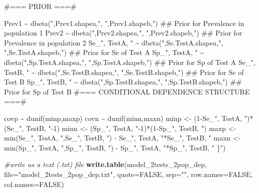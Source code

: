 \documentclass[
]{book}
\newenvironment{Shaded}{\begin{snugshade}}{\end{snugshade}}
\newcommand{\AttributeTok}[1]{\textcolor[rgb]{0.13,0.29,0.53}{#1}}
\newcommand{\CommentTok}[1]{\textcolor[rgb]{0.56,0.35,0.01}{\textit{#1}}}
\newcommand{\ConstantTok}[1]{\textcolor[rgb]{0.56,0.35,0.01}{#1}}
\newcommand{\FunctionTok}[1]{\textcolor[rgb]{0.13,0.29,0.53}{\textbf{#1}}}
\newcommand{\NormalTok}[1]{#1}
\newcommand{\StringTok}[1]{\textcolor[rgb]{0.31,0.60,0.02}{#1}}
\begin{document}
\begin{Shaded}
\begin{Highlighting}[]
\StringTok{  }
\StringTok{  }
\StringTok{\#=== PRIOR  ===\#}

\StringTok{  Prev1 \textasciitilde{} dbeta("}\NormalTok{,Prev1.shapea,}\StringTok{", "}\NormalTok{,Prev1.shapeb,}\StringTok{")     \#\# Prior for Prevalence in population 1}
\StringTok{  Prev2 \textasciitilde{} dbeta("}\NormalTok{,Prev2.shapea,}\StringTok{", "}\NormalTok{,Prev2.shapeb,}\StringTok{")     \#\# Prior for Prevalence in population 2}
\StringTok{  Se\_"}\NormalTok{, TestA, }\StringTok{" \textasciitilde{} dbeta("}\NormalTok{,Se.TestA.shapea,}\StringTok{", "}\NormalTok{,Se.TestA.shapeb,}\StringTok{")  \#\# Prior for Se of Test A}
\StringTok{  Sp\_"}\NormalTok{, TestA, }\StringTok{" \textasciitilde{} dbeta("}\NormalTok{,Sp.TestA.shapea,}\StringTok{", "}\NormalTok{,Sp.TestA.shapeb,}\StringTok{")  \#\# Prior for Sp of Test A}
\StringTok{  Se\_"}\NormalTok{, TestB, }\StringTok{" \textasciitilde{} dbeta("}\NormalTok{,Se.TestB.shapea,}\StringTok{", "}\NormalTok{,Se.TestB.shapeb,}\StringTok{")  \#\# Prior for Se of Test B}
\StringTok{  Sp\_"}\NormalTok{, TestB, }\StringTok{" \textasciitilde{} dbeta("}\NormalTok{,Sp.TestB.shapea,}\StringTok{", "}\NormalTok{,Sp.TestB.shapeb,}\StringTok{")  \#\# Prior for Sp of Test B}
\StringTok{  }
\StringTok{  \#=== CONDITIONAL DEPENDENCE STRUCTURE ===\#}

\StringTok{  covp \textasciitilde{} dunif(minp,maxp)}
\StringTok{  covn \textasciitilde{} dunif(minn,maxn)}
\StringTok{  minp \textless{}{-} (1{-}Se\_"}\NormalTok{, TestA, }\StringTok{")*(Se\_"}\NormalTok{, TestB, }\StringTok{"{-}1)}
\StringTok{  minn \textless{}{-} (Sp\_"}\NormalTok{, TestA, }\StringTok{"{-}1)*(1{-}Sp\_"}\NormalTok{, TestB, }\StringTok{")}
\StringTok{  maxp \textless{}{-} min(Se\_"}\NormalTok{, TestA, }\StringTok{",Se\_"}\NormalTok{, TestB, }\StringTok{") {-} Se\_"}\NormalTok{, TestA, }\StringTok{"*Se\_"}\NormalTok{, TestB, }\StringTok{"    }
\StringTok{  maxn \textless{}{-} min(Sp\_"}\NormalTok{, TestA, }\StringTok{",Sp\_"}\NormalTok{, TestB, }\StringTok{") {-} Sp\_"}\NormalTok{, TestA, }\StringTok{"*Sp\_"}\NormalTok{, TestB, }\StringTok{"  }
\StringTok{  }
\StringTok{\}"}\NormalTok{)}

\CommentTok{\#write as a text (.txt) file}
\FunctionTok{write.table}\NormalTok{(model\_2tests\_2pop\_dep, }
            \AttributeTok{file=}\StringTok{"model\_2tests\_2pop\_dep.txt"}\NormalTok{, }
            \AttributeTok{quote=}\ConstantTok{FALSE}\NormalTok{, }
            \AttributeTok{sep=}\StringTok{""}\NormalTok{, }
            \AttributeTok{row.names=}\ConstantTok{FALSE}\NormalTok{,}
            \AttributeTok{col.names=}\ConstantTok{FALSE}\NormalTok{)}
\end{Highlighting}
\end{Shaded}
\end{document}
